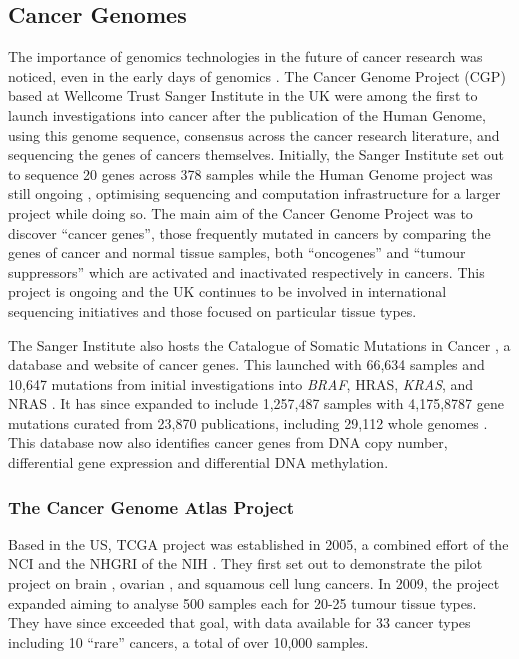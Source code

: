\subsection{Cancer Genomes}
The importance of genomics technologies in the future of cancer research was noticed, even in the early days of \gls{genomics} \citep{Dickson1999}. The Cancer Genome Project (CGP) based at Wellcome Trust Sanger Institute in the UK were among the first to launch investigations into cancer after the publication of the Human Genome, using this genome sequence, consensus across the cancer research literature, and sequencing the genes of cancers themselves. Initially, the Sanger Institute set out to sequence 20 genes across 378 samples while the Human Genome project was still ongoing \citep{Collins2007}, optimising sequencing and computation infrastructure for a larger project while doing so. The main aim of the Cancer Genome Project was to discover ``cancer genes'', those frequently mutated in cancers by comparing the genes of cancer and normal tissue samples, both ``oncogenes'' and ``tumour suppressors'' which are activated and inactivated respectively in cancers. This project is ongoing and the UK continues to be involved in international sequencing initiatives and those focused on particular tissue types.

The Sanger Institute also hosts the Catalogue of Somatic Mutations in Cancer \citep{COSMICdb}, a database and website of cancer genes. This launched with 66,634 samples and 10,647 mutations from initial investigations into \textit{BRAF}, HRAS, \textit{KRAS}, and NRAS \citep{Bamford2004}. It has since expanded to include 1,257,487 samples with 4,175,8787 gene mutations curated from 23,870 publications, including 29,112 whole genomes \citep{COSMICdb}. This database now also identifies cancer genes from DNA copy number, differential gene expression and differential DNA methylation.

\subsubsection{The Cancer Genome Atlas Project} \label{TCGA_Intro}
Based in the US, \acrfull{TCGA} project was established in 2005, a combined effort of the \gls{NCI} and the \gls{NHGRI} of the \gls{NIH} \citep{TCGA2017web}. They first set out to demonstrate the pilot project on brain \citep{TCGA2008GBM}, ovarian \citep{TCGA2011OV}, and squamous cell lung \citep{TCGA2012LUSC} cancers. In 2009, the project expanded aiming to analyse 500 samples each for 20-25 tumour tissue types. They have since exceeded that goal, with data available for 33 cancer types including 10 ``rare'' cancers, a total of over 10,000 samples.

